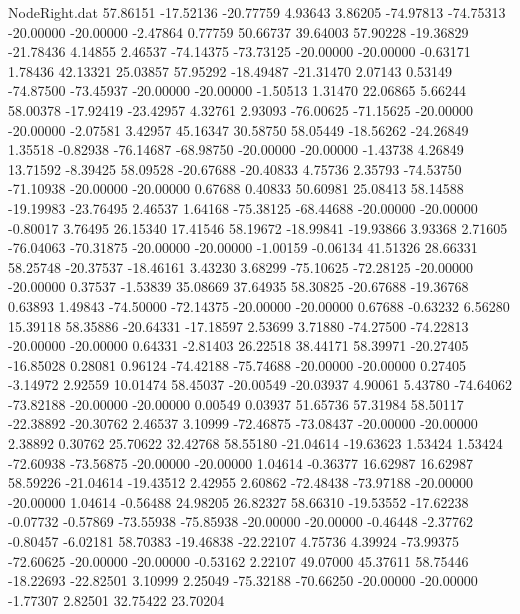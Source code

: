 \begin{filecontents}{NodeRight.dat}
  57.86151  -17.52136  -20.77759     4.93643    3.86205  -74.97813  -74.75313  -20.00000  -20.00000   -2.47864    0.77759   50.66737   39.64003
  57.90228  -19.36829  -21.78436     4.14855    2.46537  -74.14375  -73.73125  -20.00000  -20.00000   -0.63171    1.78436   42.13321   25.03857
  57.95292  -18.49487  -21.31470     2.07143    0.53149  -74.87500  -73.45937  -20.00000  -20.00000   -1.50513    1.31470   22.06865    5.66244
  58.00378  -17.92419  -23.42957     4.32761    2.93093  -76.00625  -71.15625  -20.00000  -20.00000   -2.07581    3.42957   45.16347   30.58750
  58.05449  -18.56262  -24.26849     1.35518   -0.82938  -76.14687  -68.98750  -20.00000  -20.00000   -1.43738    4.26849   13.71592   -8.39425
  58.09528  -20.67688  -20.40833     4.75736    2.35793  -74.53750  -71.10938  -20.00000  -20.00000    0.67688    0.40833   50.60981   25.08413
  58.14588  -19.19983  -23.76495     2.46537    1.64168  -75.38125  -68.44688  -20.00000  -20.00000   -0.80017    3.76495   26.15340   17.41546
  58.19672  -18.99841  -19.93866     3.93368    2.71605  -76.04063  -70.31875  -20.00000  -20.00000   -1.00159   -0.06134   41.51326   28.66331
  58.25748  -20.37537  -18.46161     3.43230    3.68299  -75.10625  -72.28125  -20.00000  -20.00000    0.37537   -1.53839   35.08669   37.64935
  58.30825  -20.67688  -19.36768     0.63893    1.49843  -74.50000  -72.14375  -20.00000  -20.00000    0.67688   -0.63232    6.56280   15.39118
  58.35886  -20.64331  -17.18597     2.53699    3.71880  -74.27500  -74.22813  -20.00000  -20.00000    0.64331   -2.81403   26.22518   38.44171
  58.39971  -20.27405  -16.85028     0.28081    0.96124  -74.42188  -75.74688  -20.00000  -20.00000    0.27405   -3.14972    2.92559   10.01474
  58.45037  -20.00549  -20.03937     4.90061    5.43780  -74.64062  -73.82188  -20.00000  -20.00000    0.00549    0.03937   51.65736   57.31984
  58.50117  -22.38892  -20.30762     2.46537    3.10999  -72.46875  -73.08437  -20.00000  -20.00000    2.38892    0.30762   25.70622   32.42768
  58.55180  -21.04614  -19.63623     1.53424    1.53424  -72.60938  -73.56875  -20.00000  -20.00000    1.04614   -0.36377   16.62987   16.62987
  58.59226  -21.04614  -19.43512     2.42955    2.60862  -72.48438  -73.97188  -20.00000  -20.00000    1.04614   -0.56488   24.98205   26.82327
  58.66310  -19.53552  -17.62238    -0.07732   -0.57869  -73.55938  -75.85938  -20.00000  -20.00000   -0.46448   -2.37762   -0.80457   -6.02181
  58.70383  -19.46838  -22.22107     4.75736    4.39924  -73.99375  -72.60625  -20.00000  -20.00000   -0.53162    2.22107   49.07000   45.37611
  58.75446  -18.22693  -22.82501     3.10999    2.25049  -75.32188  -70.66250  -20.00000  -20.00000   -1.77307    2.82501   32.75422   23.70204

\end{filecontents}
